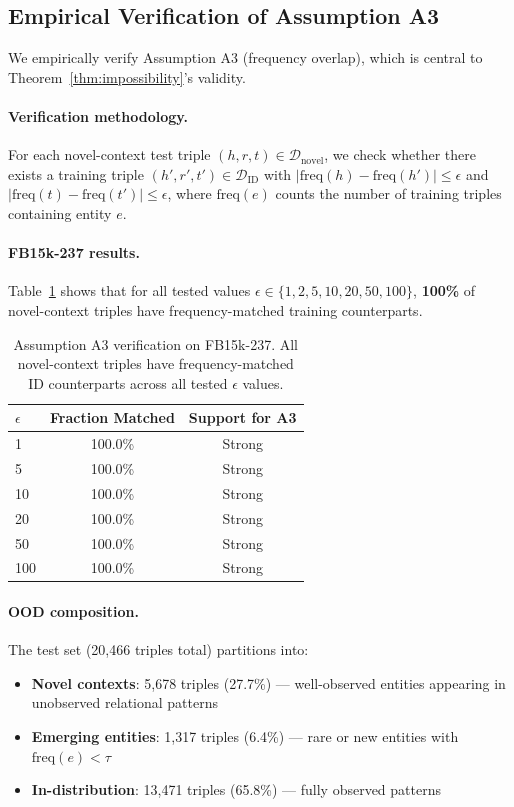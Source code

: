 \documentclass[accepted]{uai2024}  %
\begin{document}
\subsection{Empirical Verification of Assumption A3}
\label{app:assumption_verification}

We empirically verify Assumption A3 (frequency overlap), which is central to Theorem~\ref{thm:impossibility}'s validity.

\paragraph{Verification methodology.}
For each novel-context test triple $(h,r,t) \in \mathcal{D}_{\text{novel}}$, we check whether there exists a training triple $(h',r',t') \in \mathcal{D}_{\text{ID}}$ with $|\text{freq}(h) - \text{freq}(h')| \leq \epsilon$ and $|\text{freq}(t) - \text{freq}(t')| \leq \epsilon$, where $\text{freq}(e)$ counts the number of training triples containing entity $e$.

\paragraph{FB15k-237 results.}
Table~\ref{tab:assumption_a3} shows that for all tested values $\epsilon \in \{1, 2, 5, 10, 20, 50, 100\}$, \textbf{100\%} of novel-context triples have frequency-matched training counterparts.

\begin{table}[h]
\centering
\caption{Assumption A3 verification on FB15k-237. All novel-context triples have frequency-matched ID counterparts across all tested $\epsilon$ values.}
\label{tab:assumption_a3}
\small
\begin{tabular}{lcc}
\toprule
$\epsilon$ & Fraction Matched & Support for A3 \\
\midrule
1   & 100.0\% & Strong \\
5   & 100.0\% & Strong \\
10  & 100.0\% & Strong \\
20  & 100.0\% & Strong \\
50  & 100.0\% & Strong \\
100 & 100.0\% & Strong \\
\bottomrule
\end{tabular}
\end{table}

\paragraph{OOD composition.}
The test set (20,466 triples total) partitions into:
\begin{itemize}
\item \textbf{Novel contexts}: 5,678 triples (27.7\%) --- well-observed entities appearing in unobserved relational patterns
\item \textbf{Emerging entities}: 1,317 triples (6.4\%) --- rare or new entities with $\text{freq}(e) < \tau$
\item \textbf{In-distribution}: 13,471 triples (65.8\%) --- fully observed patterns
\end{itemize}
\end{document}

